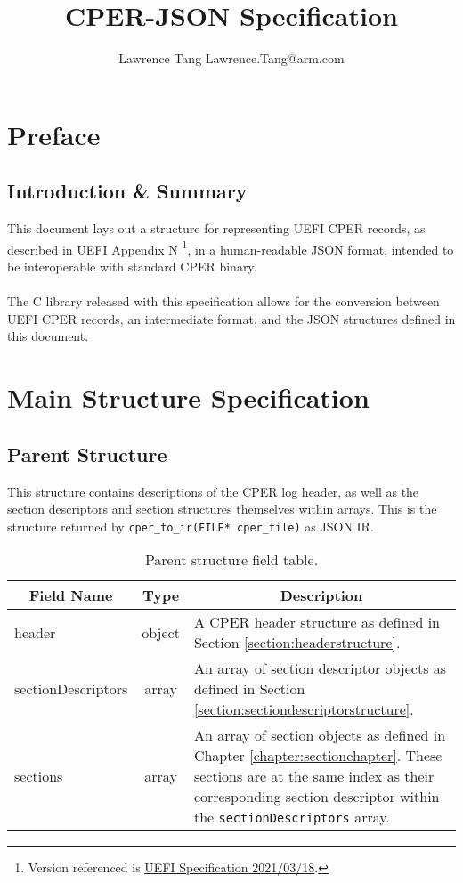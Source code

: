 \documentclass{report}
\title{CPER-JSON Specification}
\author{\parbox{\linewidth}{\centering%
Lawrence Tang\endgraf
Lawrence.Tang@arm.com\endgraf\medskip}}
\date{\parbox{\linewidth}{\centering%
Revision v0.0.1 (\today)\endgraf
First revision released [DATE].}}
\newcommand*{\thead}[1]{\multicolumn{1}{|c|}{\bfseries #1}}
\newcommand*{\jsontable}[1]{
    \begin{table}[!ht]
    \label{#1}
    \centering
    \begin{adjustbox}{center}
    \begin{tabular}{|l|c|p{8cm}|}
    \hline
    \thead{Field Name} & \thead{Type} & \thead{Description} \\
    \hline
}
\newcommand*{\jsontableend}[1]{
    \hline
    \end{tabular}
    \end{adjustbox}
    \caption{#1}
    \label{table:#1}
    \end{table}
    \FloatBarrier
}
\begin{document}
\maketitle
\tableofcontents
\listoftables

\chapter{Preface}
\section{Introduction \& Summary}
This document lays out a structure for representing UEFI CPER records, as described in UEFI Appendix N
\footnote{Version referenced is \href{https://uefi.org/sites/default/files/resources/UEFI_Spec_2_9_2021_03_18.pdf}{UEFI Specification 2021/03/18}.},
 in a human-readable JSON format, intended to be interoperable with standard CPER binary.
\\\\
The C library released with this specification allows for the conversion between UEFI CPER records, an intermediate format, and the JSON structures
defined in this document.

\chapter{Main Structure Specification}
\section{Parent Structure}
\label{section:parentstructure}
This structure contains descriptions of the CPER log header, as well as the section descriptors and
section structures themselves within arrays. This is the structure returned by \texttt{cper\_to\_ir(FILE* cper\_file)} as JSON IR.

\jsontable{table:parentstructure}
header & object & A CPER header structure as defined in Section \ref{section:headerstructure}. \\
\hline
sectionDescriptors & array & An array of section descriptor objects as defined in Section \ref{section:sectiondescriptorstructure}. \\
\hline
sections & array & An array of section objects as defined in Chapter \ref{chapter:sectionchapter}. These sections are at the same index as their corresponding section descriptor within the \texttt{sectionDescriptors} array.\\
\jsontableend{Parent structure field table.}
\end{document}

